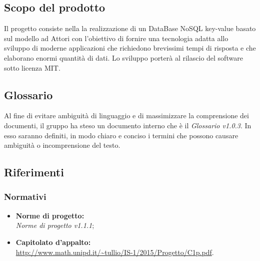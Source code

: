 \documentclass[a4paper]{article}
\begin{document}
		\subsection{Scopo del prodotto}
			Il progetto consiste nella la realizzazione di un DataBase NoSQL key-value basato sul modello ad 
			Attori con l'obiettivo di fornire una tecnologia adatta allo sviluppo di moderne 
			applicazioni che richiedono brevissimi tempi di risposta e che elaborano enormi quantità 
			di dati. Lo sviluppo porterà al rilascio del software sotto licenza MIT.
		\subsection{Glossario}
			Al fine di evitare ambiguità di linguaggio e di massimizzare la comprensione dei documenti, il 
	      gruppo ha steso un documento interno che è il \emph{Glossario v1.0.3}. In esso saranno definiti, in modo
	      chiaro e conciso i termini che possono causare ambiguità o incomprensione del testo.
		\subsection{Riferimenti}
			\subsubsection{Normativi}
				\begin{itemize}
					\item \textbf{Norme di progetto:} \\ \emph{Norme di progetto v1.1.1};
					\item \textbf{Capitolato d'appalto:} \\ \url{http://www.math.unipd.it/~tullio/IS-1/2015/Progetto/C1p.pdf}.
				\end{itemize}
\end{document}
